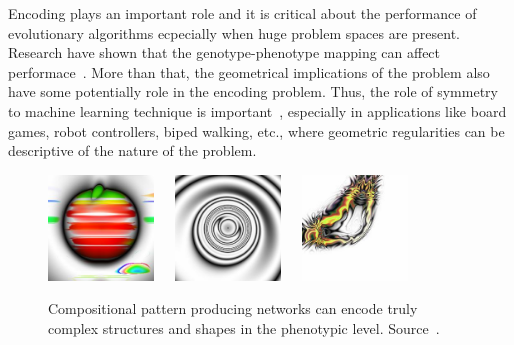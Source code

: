 Encoding plays an important role and it is critical about the performance of evolutionary algorithms ecpecially when huge problem spaces are present. Research have shown that the genotype-phenotype mapping can affect performace~\cite{komosinski2001comparison}. More than that, the geometrical implications of the problem also have some potentially role in the encoding problem. Thus, the role of symmetry to machine learning technique is important~\cite{gauci:aaai08}, especially in applications like board games, robot controllers, biped walking, etc., where geometric regularities can be descriptive of the nature of the problem.



\begin{figure}
\centering
\includegraphics[width=0.25\textwidth]{../Figures/Misc/picBreed3.jpg}\  \   \   
\includegraphics[width=0.25\textwidth]{../Figures/Misc/picBreed1.jpg}\  \   \   
\includegraphics[width=0.25\textwidth]{../Figures/Misc/picBreed2.jpg}
\caption{Compositional pattern producing networks can encode truly complex structures and shapes in the phenotypic level. Source~\cite{picbreederSite}.}
\label{fig:cppnImages}
\end{figure}



